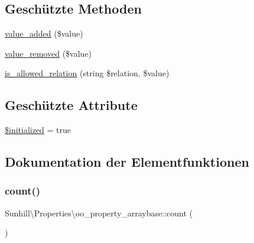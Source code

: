 \subsection*{Geschützte Methoden}
\begin{DoxyCompactItemize}
\item 
\hyperlink{classSunhill_1_1Properties_1_1oo__property__arraybase_a53afdc0cc5cef197c49ee256d89ab550}{value\+\_\+added} (\$value)
\item 
\hyperlink{classSunhill_1_1Properties_1_1oo__property__arraybase_a6ee17cf12e5883d40ebbf7cc58943558}{value\+\_\+removed} (\$value)
\item 
\hyperlink{classSunhill_1_1Properties_1_1oo__property__arraybase_afd0cb9b105b397fd877a9f495b65fc0b}{is\+\_\+allowed\+\_\+relation} (string \$relation, \$value)
\end{DoxyCompactItemize}
\subsection*{Geschützte Attribute}
\begin{DoxyCompactItemize}
\item 
\hyperlink{classSunhill_1_1Properties_1_1oo__property__arraybase_ae6e1a4fc663bddc9d7225368216b3e9e}{\$initialized} = true
\end{DoxyCompactItemize}


\subsection{Dokumentation der Elementfunktionen}
\mbox{\label{classSunhill_1_1Properties_1_1oo__property__arraybase_a73ea6101a7a2cbc51e7fa50a579c334f}} 
\subsubsection{\texorpdfstring{count()}{count()}}
{\footnotesize\ttfamily Sunhill\textbackslash{}\+Properties\textbackslash{}oo\+\_\+property\+\_\+arraybase\+::count (\begin{DoxyParamCaption}{ }\end{DoxyParamCaption})}


